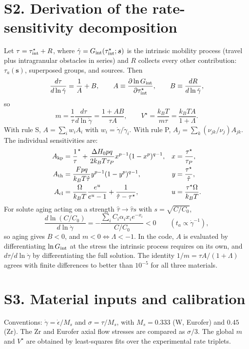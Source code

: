 \documentclass[aps,prl,onecolumn,superscriptaddress,amsmath,amssymb,floatfix]{revtex4-2}
\newcommand{\gd}{\dot\gamma}
\newcommand{\ts}{\tau^{\star}}
\newcommand{\kT}{k_BT}
\begin{document}
\section{S2. Derivation of the rate-sensitivity decomposition}
Let $\tau=\tau^\star_{\rm int}+R$, where $\gd=G_{\rm int}(\tau^\star_{\rm int};\bm s)$ is the intrinsic mobility process (travel plus intragranular obstacles in series) and $R$ collects every other contribution: $\tau_a(\bm s)$, superposed groups, and sources. Then
\begin{equation}
\frac{d\tau}{d\ln\gd}=\frac{1}{A}+B,\qquad A\equiv\frac{\partial\ln G_{\rm int}}{\partial\tau^\star_{\rm int}},\qquad B\equiv\frac{dR}{d\ln\gd},
\end{equation}
so
\begin{equation}
m=\frac{1}{\tau}\frac{d\tau}{d\ln\gd}=\frac{1+AB}{\tau A},\qquad V^\star=\frac{\kT}{m\tau}=\frac{\kT A}{1+\Lambda}.
\end{equation}
With rule S, $A=\sum_iw_iA_i$ with $w_i=\gd/\gd_i$. With rule P, $A_j=\sum_k(\nu_{jk}/\nu_j)A_{jk}$. The individual sensitivities are:
\begin{align}
A_{\rm kp}&=\frac1\ts+\frac{\Delta H_0pq}{2\kT\tau_P}x^{p-1}(1-x^p)^{q-1},& x&=\frac{\ts}{\tau_P},\\
A_{\rm th}&=\frac{Fpq}{\kT\hat\tau}y^{p-1}(1-y^p)^{q-1},& y&=\frac{\ts}{\hat\tau},\\
A_{\rm cl}&=\frac{\Omega}{\kT}\frac{e^u}{e^u-1}+\frac{1}{\hat\tau-\ts},& u&=\frac{\ts\Omega}{\kT}.
\end{align}
For solute aging acting on a strength $\hat\tau\to\hat\tau s$ with $s=\sqrt{C/C_0}$,
\begin{equation}
\frac{d\ln(C/C_0)}{d\ln\gd}=-\frac{\sum_iC_i\alpha_ix_ie^{-x_i}}{C/C_0}<0 \qquad (t_a\propto\gd^{-1}),
\end{equation}
so aging gives $B<0$, and $m<0\iff\Lambda<-1$. In the code, $A$ is evaluated by differentiating $\ln G_{\rm int}$ at the stress the intrinsic process requires on its own, and $d\tau/d\ln\gd$ by differentiating the full solution. The identity $1/m=\tau A/(1+\Lambda)$ agrees with finite differences to better than $10^{-5}$ for all three materials.

\section{S3. Material inputs and calibration}
Conventions: $\gd=\dot\epsilon/M_s$ and $\sigma=\tau/M_s$, with $M_s=0.333$ (W, Eurofer) and $0.45$ (Zr). The Zr and Eurofer axial flow stresses are compared as $\sigma/3$. The global $m$ and $V^\star$ are obtained by least-squares fits over the experimental rate triplets.
\end{document}

